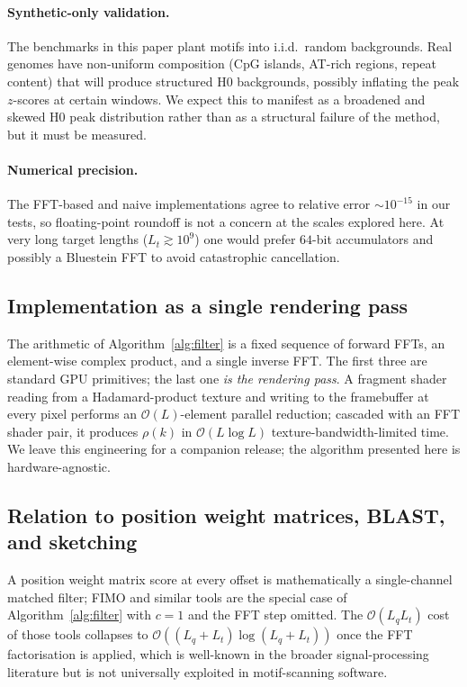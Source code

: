\documentclass[11pt,a4paper]{article}
\theoremstyle{definition}
\theoremstyle{remark}
\newcommand{\bigO}{\mathcal{O}}
\begin{document}
\paragraph{Synthetic-only validation.} The benchmarks in this paper
plant motifs into i.i.d.\ random backgrounds. Real genomes have
non-uniform composition (CpG islands, AT-rich regions, repeat content)
that will produce structured H0 backgrounds, possibly inflating the
peak $z$-scores at certain windows. We expect this to manifest as a
broadened and skewed H0 peak distribution rather than as a structural
failure of the method, but it must be measured.

\paragraph{Numerical precision.} The FFT-based and naive implementations
agree to relative error $\sim 10^{-15}$ in our tests, so floating-point
roundoff is not a concern at the scales explored here. At very long
target lengths ($L_t \gtrsim 10^9$) one would prefer $64$-bit accumulators
and possibly a Bluestein FFT to avoid catastrophic cancellation.

\subsection{Implementation as a single rendering pass}

The arithmetic of Algorithm~\ref{alg:filter} is a fixed sequence of
forward FFTs, an element-wise complex product, and a single inverse
FFT. The first three are standard GPU primitives; the last one
\emph{is the rendering pass}. A fragment shader reading from a
Hadamard-product texture and writing to the framebuffer at every
pixel performs an $\bigO(L)$-element parallel reduction; cascaded
with an FFT shader pair, it produces $\rho(k)$ in $\bigO(L \log L)$
texture-bandwidth-limited time. We leave this engineering for a
companion release; the algorithm presented here is hardware-agnostic.

\subsection{Relation to position weight matrices, BLAST, and sketching}

A position weight matrix score at every offset is mathematically a
single-channel matched filter; FIMO and similar tools
\citep{grant2011} are the special case of Algorithm~\ref{alg:filter}
with $c = 1$ and the FFT step omitted. The $\bigO(L_q L_t)$ cost of
those tools collapses to $\bigO((L_q + L_t) \log(L_q + L_t))$ once the
FFT factorisation is applied, which is well-known in the broader
signal-processing literature \citep{fischer1974} but is not
universally exploited in motif-scanning software.
\end{document}
